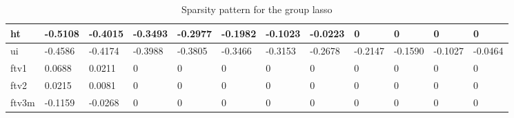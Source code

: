 \documentclass[a4paper,12pt]{article}
\begin{document}
\begin{table}[H]
{\begin{tabular}{|l|l|l|l|l|l|l|l|l|l|l|l|}
ht                     & -0.5108 & -0.4015 & -0.3493 & -0.2977 & -0.1982 & -0.1023 & -0.0223 & 0       & 0       & 0       & 0       \\ \hline
ui                     & -0.4586 & -0.4174 & -0.3988 & -0.3805 & -0.3466 & -0.3153 & -0.2678 & -0.2147 & -0.1590 & -0.1027 & -0.0464 \\ \hline
ftv1                   & 0.0688  & 0.0211  & 0       & 0       & 0       & 0       & 0       & 0       & 0       & 0       & 0       \\ \hline
ftv2                   & 0.0215  & 0.0081  & 0       & 0       & 0       & 0       & 0       & 0       & 0       & 0       & 0       \\ \hline
ftv3m                  & -0.1159 & -0.0268 & 0       & 0       & 0       & 0       & 0       & 0       & 0       & 0       & 0       \\ \hline
\end{tabular}
}
\caption{Sparsity pattern for the group lasso}

\end{table}
\end{document}
